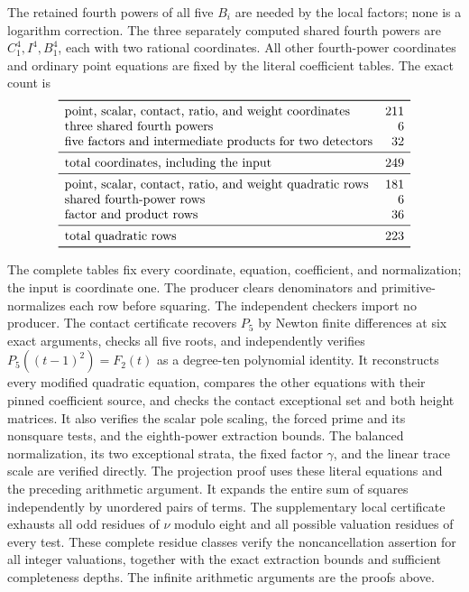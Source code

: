 \documentclass[11pt,a4paper]{article}
\begin{document}
The retained fourth powers of all five $B_i$ are needed by the
local factors; none is a logarithm correction. The three separately
computed shared fourth powers are $C_1^4,I^4,B_1^4$, each with two
rational coordinates. All other fourth-power coordinates and ordinary
point equations are fixed by the literal coefficient tables.
The exact count is
\[
\begin{array}{lr}\toprule
\text{point, scalar, contact, ratio, and weight coordinates}&211\\
\text{three shared fourth powers}&6\\
\text{five factors and intermediate products for two detectors}&32\\\midrule
\text{total coordinates, including the input}&249\\\midrule
\text{point, scalar, contact, ratio, and weight quadratic rows}&181\\
\text{shared fourth-power rows}&6\\
\text{factor and product rows}&36\\\midrule
\text{total quadratic rows}&223\\\bottomrule
\end{array}
\]

The complete tables fix every coordinate, equation, coefficient, and
normalization; the input is coordinate one. The producer clears
denominators and primitive-normalizes each row before squaring.
The independent checkers import no producer. The contact certificate recovers $P_5$ by
Newton finite differences at six exact arguments, checks all five roots,
and independently verifies $P_5((t-1)^2)=F_2(t)$ as a degree-ten
polynomial identity. It reconstructs every modified quadratic equation,
compares the other equations with their pinned coefficient source, and
checks the contact exceptional set and both height matrices. It also verifies the scalar pole scaling, the forced prime and its nonsquare tests, and the eighth-power extraction bounds.
The balanced normalization, its two exceptional strata, the fixed factor $\gamma$, and the linear trace scale are verified directly.
The projection proof uses these literal equations and the preceding
arithmetic argument.
It expands the entire sum of squares independently by unordered
pairs of terms. The supplementary local certificate exhausts all
odd residues of $\nu$ modulo eight and all possible valuation residues
of every test. These complete residue classes verify the
noncancellation assertion for all integer valuations, together with
the exact extraction bounds and sufficient completeness depths.
The infinite arithmetic arguments are the proofs above.
\end{document}

